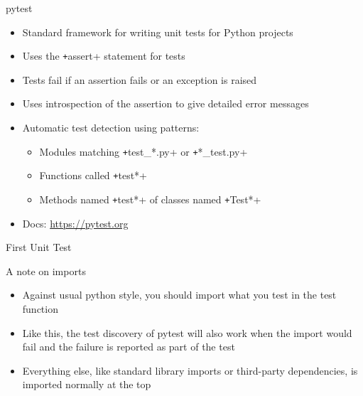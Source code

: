 \begin{frame}[c, fragile]{pytest}
  \begin{itemize}
    \item Standard framework for writing unit tests for Python projects
    \item Uses the \texttt+assert+ statement for tests
    \item Tests fail if an assertion fails or an exception is raised
    \item Uses introspection of the assertion to give detailed error messages
    \item Automatic test detection using patterns:
      \begin{itemize}
        \item Modules matching \texttt+test_*.py+ or \texttt+*_test.py+
        \item Functions called \texttt+test*+
        \item Methods named \texttt+test*+ of classes named \texttt+Test*+
      \end{itemize}

    \item Docs: \url{https://pytest.org}
  \end{itemize}

\end{frame}

\begin{frame}[c, fragile]{First Unit Test}

\end{frame}

\begin{frame}[c]{A note on imports}

  \begin{itemize}
    \item Against usual python style, you should import what you test in the test function
    \item Like this, the test discovery of pytest will also work when the import would fail and the failure is reported as part of the test
    \item Everything else, like standard library imports or third-party dependencies, is imported normally at the top
  \end{itemize}
\end{frame}

